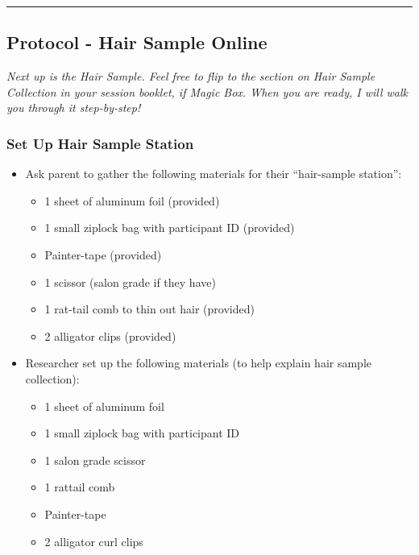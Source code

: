 \documentclass[]{book}
\begin{document}
\begin{center}\rule{0.5\linewidth}{0.5pt}\end{center}

\hypertarget{protocol---hair-sample-online-2}{%
\subsection{Protocol - Hair Sample Online}\label{protocol---hair-sample-online-2}}

\emph{Next up is the Hair Sample. Feel free to flip to the section on Hair Sample Collection in your session booklet, if Magic Box. When you are ready, I will walk you through it step-by-step!}

\hypertarget{set-up-hair-sample-station-3}{%
\subsubsection{Set Up Hair Sample Station}\label{set-up-hair-sample-station-3}}

\begin{itemize}
\item
  Ask parent to gather the following materials for their ``hair-sample station'':

  \begin{itemize}
  \item
    1 sheet of aluminum foil (provided)
  \item
    1 small ziplock bag with participant ID (provided)
  \item
    Painter-tape (provided)
  \item
    1 scissor (salon grade if they have)
  \item
    1 rat-tail comb to thin out hair (provided)
  \item
    2 alligator clips (provided)
  \end{itemize}
\item
  Researcher set up the following materials (to help explain hair sample collection):

  \begin{itemize}
  \item
    1 sheet of aluminum foil
  \item
    1 small ziplock bag with participant ID
  \item
    1 salon grade scissor
  \item
    1 rattail comb
  \item
    Painter-tape
  \item
    2 alligator curl clips
  \end{itemize}
\end{itemize}
\end{document}
